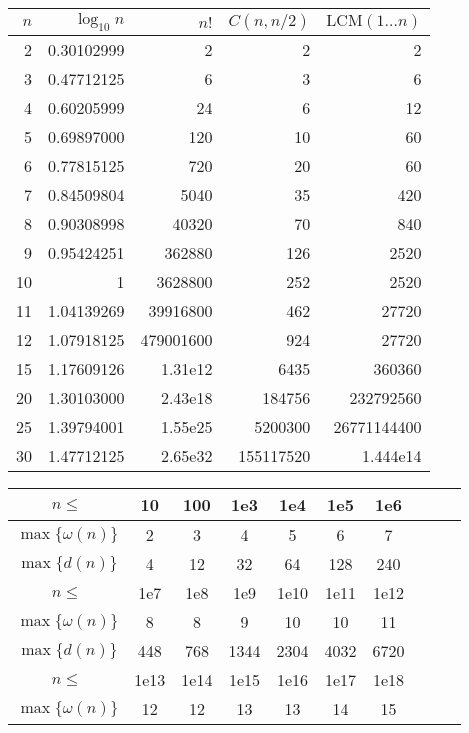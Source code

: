 \begin{table}[H]
	\centering
	\small
	\renewcommand\arraystretch{0.8}
	\begin{tabular}{|r|r|r|r|r|}
		\hline
		$n$ & $\log_{10} n$ & $n!$ & $C(n,n/2)$ & $\mathrm{LCM}(1\dots n)$\\
		\hline
		2 & 0.30102999 & 2 & 2 & 2\\
		\hline
		3 & 0.47712125 & 6 & 3 & 6\\
		\hline
		4 & 0.60205999 & 24 & 6 & 12\\
		\hline
		5 & 0.69897000 & 120 & 10 & 60 \\
		\hline
		6 & 0.77815125 & 720 & 20 & 60 \\
		\hline
		7 & 0.84509804 & 5040 & 35 & 420 \\
		\hline
		8 & 0.90308998 & 40320 & 70 & 840\\
		\hline
		9 & 0.95424251 & 362880 & 126 & 2520\\
		\hline
		10 & 1 & 3628800 & 252  & 2520\\
		\hline
		11 & 1.04139269 & 39916800 & 462  & 27720 \\
		\hline
		12 & 1.07918125 & 479001600 & 924 & 27720\\
		\hline
		15 & 1.17609126 & 1.31e{12} & 6435 & 360360\\
		\hline
		20 & 1.30103000 & 2.43e{18} & 184756 & 232792560\\
		\hline
		25 & 1.39794001 & 1.55e{25} & 5200300 & 26771144400 \\
		\hline
		30 & 1.47712125 & 2.65e{32} & 155117520 & 1.444e{14}\\
		\hline
		\end{tabular}
		\begin{tabular}{|c|c|c|c|c|c|c|c|c|c|}
			\hline
			$n \leq$ & 10 &  100 & 1e3 & 1e4 & 1e5 & 1e6 \\
			\hline
			$\max\{\omega(n)\}$ & 2 & 3 & 4 & 5 & 6 & 7  \\
			\hline
			$\max\{d(n)\}$ & 4 & 12 & 32 & 64 & 128 & 240 \\
			\hline
			$n \leq$ & 1e7 & 1e8 & 1e9 & 1e10 & 1e11& 1e12\\
			\hline
			$\max\{\omega(n)\}$ & 8 & 8 & 9 & 10& 10 & 11 \\
			\hline
			$\max\{d(n)\}$ & 448 & 768 & 1344 & 2304 & 4032 & 6720 \\
			\hline
			$n \leq$ & 1e13& 1e14& 1e15& 1e16& 1e17& 1e18 \\
			\hline
			$\max\{\omega(n)\}$ & 12 & 12 & 13 & 13 & 14 & 15 \\

\end{tabular}
\end{table}
